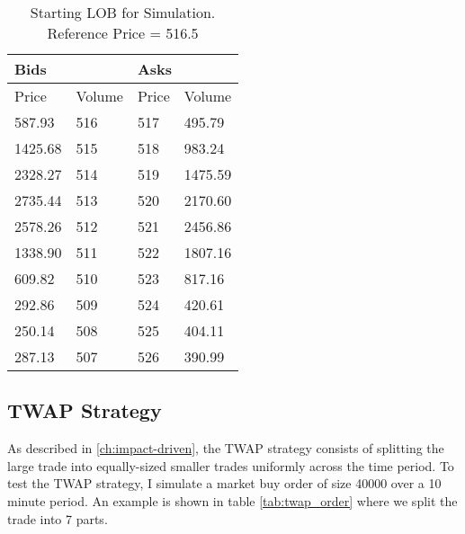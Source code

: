 \begin{table}[htbp]
\caption{Starting LOB for Simulation. Reference Price = 516.5} \label{tab:starting_LOB}
\begin{center}
\begin{tabular}{ll|ll}
\hline \hline
\multicolumn{2}{l|}{\textbf{Bids}} & \multicolumn{2}{l}{\textbf{Asks}} \\
\hline
Price        & Volume    & Price      & Volume      \\
587.93       & 516       & 517        & 495.79      \\
1425.68      & 515       & 518        & 983.24      \\
2328.27      & 514       & 519        & 1475.59     \\
2735.44      & 513       & 520        & 2170.60     \\
2578.26      & 512       & 521        & 2456.86     \\
1338.90      & 511       & 522        & 1807.16     \\
609.82       & 510       & 523        & 817.16      \\
292.86       & 509       & 524        & 420.61      \\
250.14       & 508       & 525        & 404.11      \\
287.13       & 507       & 526        & 390.99             
\end{tabular}
\end{center}
\end{table}

\subsection{TWAP Strategy}
As described in \ref{ch:impact-driven}, the TWAP strategy consists of splitting the large trade into equally-sized smaller trades uniformly across the time period. To test the TWAP strategy, I simulate a market buy order of size 40000 over a 10 minute period. An example is shown in table \ref{tab:twap_order} where we split the trade into 7 parts.


